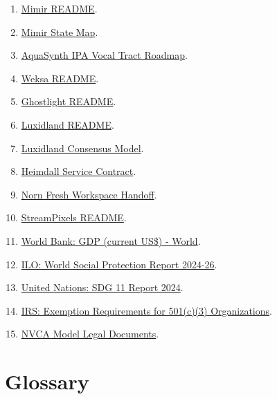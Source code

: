 \documentclass[11pt,oneside]{report}
\begin{document}
\begin{enumerate}[leftmargin=1.8em]
  \item \href{https://github.com/GameCult/Mimir/blob/main/README.md}{Mimir README}.
  \item \href{https://github.com/GameCult/Mimir/blob/main/state/map.yaml}{Mimir State Map}.
  \item \href{https://github.com/GameCult/AquaSynth/blob/main/docs/ipa-vocal-tract-roadmap.md}{AquaSynth IPA Vocal Tract Roadmap}.
  \item \href{https://github.com/GameCult/weksa/blob/main/README.md}{Weksa README}.
  \item \href{https://github.com/GameCult/Ghostlight/blob/main/README.md}{Ghostlight README}.
  \item \href{https://github.com/GameCult/Luxidland/blob/main/README.md}{Luxidland README}.
  \item \href{https://github.com/GameCult/Luxidland/blob/main/Docs/consensus-model.md}{Luxidland Consensus Model}.
  \item \href{https://github.com/GameCult/Heimdall/blob/main/docs/service-contract.md}{Heimdall Service Contract}.
  \item \href{https://github.com/GameCult/Norn/blob/main/notes/fresh-workspace-handoff.md}{Norn Fresh Workspace Handoff}.
  \item \href{https://github.com/GameCult/StreamPixels/blob/main/README.md}{StreamPixels README}.
  \item \href{https://data.worldbank.org/indicator/NY.GDP.MKTP.CD?locations=1W}{World Bank: GDP (current US\$) - World}.
  \item \href{https://www.ilo.org/publications/flagship-reports/world-social-protection-report-2024-26-universal-social-protection-climate}{ILO: World Social Protection Report 2024-26}.
  \item \href{https://unstats.un.org/sdgs/report/2024/Goal-11/}{United Nations: SDG 11 Report 2024}.
  \item \href{https://www.irs.gov/charities-non-profits/charitable-organizations/exemption-requirements-501c3-organizations}{IRS: Exemption Requirements for 501(c)(3) Organizations}.
  \item \href{https://nvca.org/model-legal-documents/}{NVCA Model Legal Documents}.
\end{enumerate}

\appendix
\chapter{Glossary}
\end{document}
